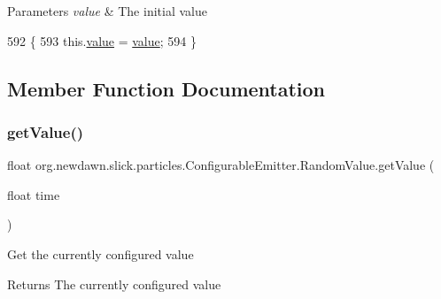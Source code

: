\begin{DoxyParams}{Parameters}
{\em value} & The initial value \\
\hline
\end{DoxyParams}

\begin{DoxyCode}
592                                          \{
593             this.\mbox{\hyperlink{classorg_1_1newdawn_1_1slick_1_1particles_1_1_configurable_emitter_1_1_random_value_a79aeb62a3f0873cf7ca46240f9e37d09}{value}} = \mbox{\hyperlink{classorg_1_1newdawn_1_1slick_1_1particles_1_1_configurable_emitter_1_1_random_value_a79aeb62a3f0873cf7ca46240f9e37d09}{value}};
594         \}
\end{DoxyCode}


\subsection{Member Function Documentation}
\mbox{\label{classorg_1_1newdawn_1_1slick_1_1particles_1_1_configurable_emitter_1_1_random_value_ae9dc013f90bbed1ed8d25830a1e91f1f}} 
\subsubsection{\texorpdfstring{get\+Value()}{getValue()}\hspace{0.1cm}{\footnotesize\ttfamily [1/2]}}
{\footnotesize\ttfamily float org.\+newdawn.\+slick.\+particles.\+Configurable\+Emitter.\+Random\+Value.\+get\+Value (\begin{DoxyParamCaption}\item[{float}]{time }\end{DoxyParamCaption})\hspace{0.3cm}{\ttfamily [inline]}}

Get the currently configured value

\begin{DoxyReturn}{Returns}
The currently configured value 
\end{DoxyReturn}


